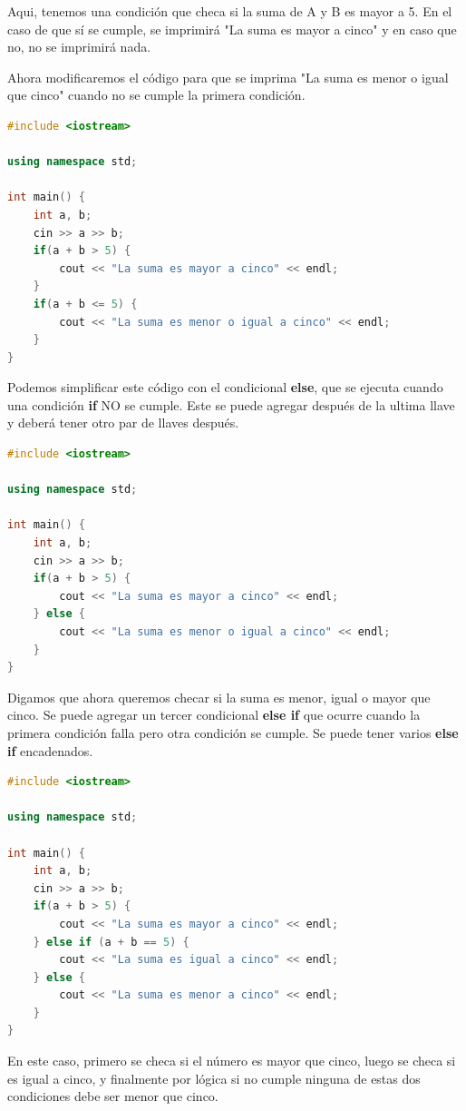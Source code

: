 \documentclass{article}
\begin{document}
Aqui, tenemos una condición que checa si la suma de A y B es mayor a 5. En el caso de que sí se cumple, se imprimirá "La suma es mayor a cinco" y en caso que no, no se imprimirá nada.

Ahora modificaremos el código para que se imprima "La suma es menor o igual que cinco" cuando no se cumple la primera condición.

\begin{lstlisting}[language=C++, title=Condiciones]
#include <iostream>

using namespace std;

int main() {
	int a, b;
	cin >> a >> b;
	if(a + b > 5) {
		cout << "La suma es mayor a cinco" << endl;
	}
	if(a + b <= 5) {
		cout << "La suma es menor o igual a cinco" << endl;
	}
}
\end{lstlisting}

Podemos simplificar este código con el condicional \textbf{else}, que se ejecuta cuando una condición \textbf{if} NO se cumple. Este se puede agregar después de la ultima llave y deberá tener otro par de llaves después.

\begin{lstlisting}[language=C++, title=Else]
#include <iostream>

using namespace std;

int main() {
	int a, b;
	cin >> a >> b;
	if(a + b > 5) {
		cout << "La suma es mayor a cinco" << endl;
	} else {
		cout << "La suma es menor o igual a cinco" << endl;
	}
}
\end{lstlisting}

Digamos que ahora queremos checar si la suma es menor, igual o mayor que cinco. Se puede agregar un tercer condicional \textbf{else if} que ocurre cuando la primera condición falla pero otra condición se cumple. Se puede tener varios \textbf{else if} encadenados.

\begin{lstlisting}[language=C++, title=Else if]
#include <iostream>

using namespace std;

int main() {
	int a, b;
	cin >> a >> b;
	if(a + b > 5) {
		cout << "La suma es mayor a cinco" << endl;
	} else if (a + b == 5) {
		cout << "La suma es igual a cinco" << endl;
	} else {
		cout << "La suma es menor a cinco" << endl;
	}
}
\end{lstlisting}

En este caso, primero se checa si el número es mayor que cinco, luego se checa si es igual a cinco, y finalmente por lógica si no cumple ninguna de estas dos condiciones debe ser menor que cinco.
\end{document}
